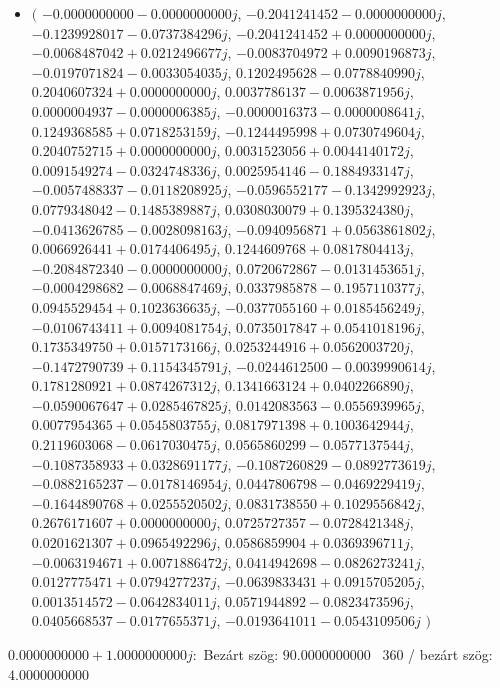 \documentclass[14pt,a4paper]{article}
\begin{document}
\begin{itemize}
\item
$\big($
$-0.0000000000-0.0000000000j$, $-0.2041241452-0.0000000000j$, $-0.1239928017-0.0737384296j$, $-0.2041241452+0.0000000000j$, $-0.0068487042+0.0212496677j$, $-0.0083704972+0.0090196873j$, $-0.0197071824-0.0033054035j$, $0.1202495628-0.0778840990j$, $0.2040607324+0.0000000000j$, $0.0037786137-0.0063871956j$, $0.0000004937-0.0000006385j$, $-0.0000016373-0.0000008641j$, $0.1249368585+0.0718253159j$, $-0.1244495998+0.0730749604j$, $0.2040752715+0.0000000000j$, $0.0031523056+0.0044140172j$, $0.0091549274-0.0324748336j$, $0.0025954146-0.1884933147j$, $-0.0057488337-0.0118208925j$, $-0.0596552177-0.1342992923j$, $0.0779348042-0.1485389887j$, $0.0308030079+0.1395324380j$, $-0.0413626785-0.0028098163j$, $-0.0940956871+0.0563861802j$, $0.0066926441+0.0174406495j$, $0.1244609768+0.0817804413j$, $-0.2084872340-0.0000000000j$, $0.0720672867-0.0131453651j$, $-0.0004298682-0.0068847469j$, $0.0337985878-0.1957110377j$, $0.0945529454+0.1023636635j$, $-0.0377055160+0.0185456249j$, $-0.0106743411+0.0094081754j$, $0.0735017847+0.0541018196j$, $0.1735349750+0.0157173166j$, $0.0253244916+0.0562003720j$, $-0.1472790739+0.1154345791j$, $-0.0244612500-0.0039990614j$, $0.1781280921+0.0874267312j$, $0.1341663124+0.0402266890j$, $-0.0590067647+0.0285467825j$, $0.0142083563-0.0556939965j$, $0.0077954365+0.0545803755j$, $0.0817971398+0.1003642944j$, $0.2119603068-0.0617030475j$, $0.0565860299-0.0577137544j$, $-0.1087358933+0.0328691177j$, $-0.1087260829-0.0892773619j$, $-0.0882165237-0.0178146954j$, $0.0447806798-0.0469229419j$, $-0.1644890768+0.0255520502j$, $0.0831738550+0.1029556842j$, $0.2676171607+0.0000000000j$, $0.0725727357-0.0728421348j$, $0.0201621307+0.0965492296j$, $0.0586859904+0.0369396711j$, $-0.0063194671+0.0071886472j$, $0.0414942698-0.0826273241j$, $0.0127775471+0.0794277237j$, $-0.0639833431+0.0915705205j$, $0.0013514572-0.0642834011j$, $0.0571944892-0.0823473596j$, $0.0405668537-0.0177655371j$, $-0.0193641011-0.0543109506j$
$\big)$
\end{itemize}
$0.0000000000+1.0000000000j$:\
Bezárt szög: $90.0000000000$ \
360 / bezárt szög: $4.0000000000$\
\end{document}
